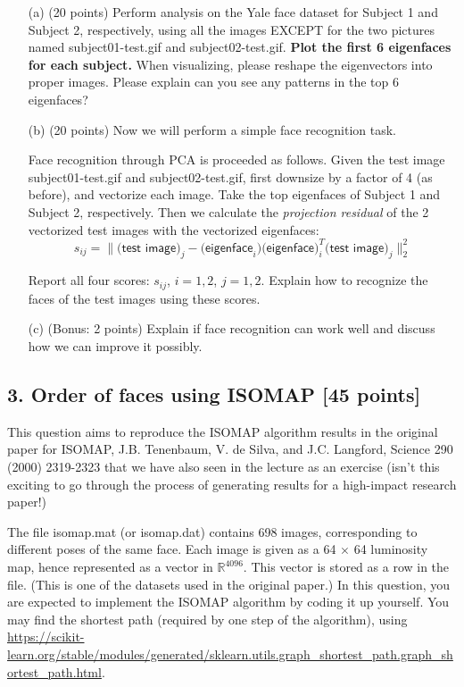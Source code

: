 \documentclass[twoside,10pt]{article}
\begin{document}
\begin{enumerate}

\item[(a)] (20 points) Perform analysis on the Yale face dataset for Subject 1 and Subject 2, respectively, using all the images EXCEPT for the two pictures named \textsf{subject01-test.gif} and \textsf{subject02-test.gif}. {\bf Plot the first 6 eigenfaces for each subject.} When visualizing, please reshape the eigenvectors into proper images. Please explain can you see any patterns in the top 6 eigenfaces?

\item[(b)] (20 points) Now we will perform a simple face recognition task. 

Face recognition through PCA is proceeded as follows. Given the test image \textsf{subject01-test.gif} and \textsf{subject02-test.gif}, first downsize by a factor of 4 (as before), and vectorize each image. Take the top eigenfaces of Subject 1 and Subject 2, respectively. Then we calculate the {\it projection residual} of the 2 vectorized test images with the vectorized eigenfaces:
\[s_{ij} = \|\textsf{(test image)}_j - \textsf{(eigenface}_i)\textsf{(eigenface})_i^T \textsf{(test image)}_j\|_2^2\]

Report all four scores: $s_{ij}$, $i = 1, 2$, $j = 1, 2.$ Explain how to recognize the faces of the test images using these scores. 

\item[(c)] (Bonus: 2 points) Explain if face recognition can work well and discuss how we can improve it possibly. 

\end{enumerate}

\clearpage

\subsection*{3. Order of faces using ISOMAP [45 points]}

This question aims to reproduce the ISOMAP algorithm results in the original paper for ISOMAP, J.B. Tenenbaum, V. de Silva, and J.C. Langford, Science 290 (2000) 2319-2323 that we have also seen in the lecture as an exercise (isn't this exciting to go through the process of generating results for a high-impact research paper!) 


The file \textsf{isomap.mat} (or \textsf{isomap.dat}) contains 698 images, corresponding to different poses of the same face. Each image is given as a 64 $\times$ 64 luminosity map, hence represented as a vector in $\mathbb R^{4096}$. This vector is stored as a row in the file. (This is one of the datasets used in the original paper.) In this question, you are expected to implement the ISOMAP algorithm by coding it up yourself. You may find the shortest path (required by one step of the algorithm), using \url{https://scikit-learn.org/stable/modules/generated/sklearn.utils.graph\_shortest\_path.graph\_shortest_path.html}. 
\end{document}
